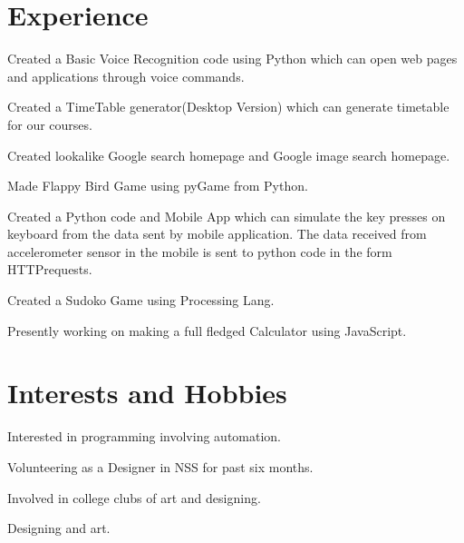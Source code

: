 \documentclass[]{deedy-resume-openfont}
\begin{document}
\begin{minipage}[t]{0.66\textwidth} 


\section{Experience}
\vspace{\topsep} %
\begin{tightemize}
\item Created a Basic Voice Recognition code using Python which can open web pages and applications through voice commands.\\
\item Created a TimeTable generator(Desktop Version) which can generate timetable for our courses. \\
\item Created lookalike Google search homepage and Google image search homepage.
\item Made Flappy Bird Game using pyGame from Python.\\
\item Created a Python code and Mobile App which can simulate the key presses on keyboard from the data sent by mobile application. The data received from accelerometer sensor in the mobile is sent to python code in the form HTTPrequests.\\
\item Created a Sudoko Game using Processing Lang.\\
\item Presently working on making a full fledged     Calculator using JavaScript.\\
\end{tightemize}
\sectionsep

\section{Interests and Hobbies}
\vspace{\topsep} %
\begin{tightemize}
\item Interested in programming involving automation.\\
\item Volunteering as a Designer in NSS for past six months.\\
\item Involved in college clubs of art and designing.\\
\item Designing and art.\\
\end{tightemize}
\sectionsep


\end{minipage}
\end{document}
